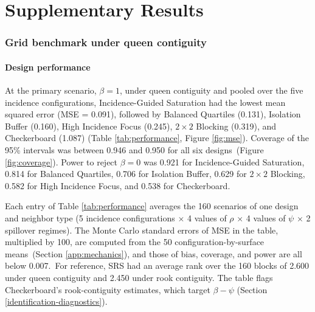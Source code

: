 \documentclass[11pt]{article}
\begin{document}
\part{Supplementary Results}

\FloatBarrier
\section{Grid benchmark under queen contiguity}\label{detailed-grid-results-and-allocation-risk-pilot}



\subsection{Design performance}\label{design-performance-under-queen-contiguity}


At the primary scenario, \(\beta = 1\), under queen contiguity and pooled
over the five incidence configurations, Incidence-Guided Saturation had the lowest mean squared error (MSE = 0.091), followed by
Balanced Quartiles (0.131), Isolation Buffer (0.160), High Incidence
Focus (0.245), \(2\times2\) Blocking (0.319), and Checkerboard (1.087)
(Table \ref{tab:performance}\iffullsi, Figure \ref{fig:mse}\fi). Coverage of the
95\% intervals was between 0.946 and 0.950 for all six designs\iffullsi\ (Figure
\ref{fig:coverage})\fi. Power to reject \(\beta = 0\) was 0.921 for Incidence-Guided Saturation, 0.814 for Balanced Quartiles, 0.706 for Isolation Buffer, 0.629 for \(2\times2\) Blocking, 0.582 for High Incidence Focus, and 0.538 for Checkerboard.

Each entry of Table \ref{tab:performance} averages the 160 scenarios of one design and neighbor type (5 incidence configurations $\times$ 4 values of $\rho$ $\times$ 4 values of $\psi$ $\times$ 2 spillover regimes). The Monte Carlo standard errors of MSE in the table, multiplied by 100, are computed from the 50 configuration-by-surface means\iffullsi\ (Section \ref{app:mechanics})\fi, and those of bias, coverage, and power are all below 0.007.\iffullsi\ For reference, SRS had an average rank over the 160 blocks of 2.600 under queen contiguity and 2.450 under rook contiguity.\fi{} The table flags Checkerboard's rook-contiguity estimates, which target $\beta-\psi$ (Section \ref{identification-diagnostics}).
\end{document}
